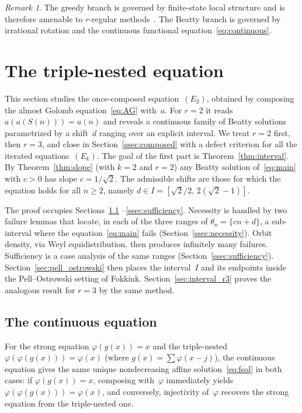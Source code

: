 \documentclass{birkjour}
\theoremstyle{definition}
\theoremstyle{remark}
\newtheorem{remark}[theorem]{Remark}
\newcommand{\frc}[1]{\{ #1 \}}
\begin{document}
\begin{remark}
The greedy branch is governed by finite-state
local structure and is therefore amenable to
$r$-regular methods~\cite{Cloitre_AG,AS}.
The Beatty branch is governed by irrational rotation
and the continuous functional
equation~\eqref{eq:continuous}.
\end{remark}

\section{The triple-nested equation}\label{sec:interval}

This section studies the once-composed equation~$(E_{2})$,
obtained by composing the almost Golomb
equation~\eqref{eq:AG} with~$a$. For $r=2$ it reads
$a(a(S(n)))=a(n)$ and reveals a continuous family of Beatty
solutions parametrized by a shift~$d$ ranging over an explicit
interval. We treat $r=2$ first, then $r=3$, and close in
Section~\ref{ssec:composed} with a defect criterion for all
the iterated equations~$(E_{k})$. The goal of the first part
is Theorem~\ref{thm:interval}. By Theorem~\ref{thm:slope} (with
$k=2$ and $r=2$) any Beatty solution of~\eqref{eq:main} with
$c>0$ has slope $c=1/\!\sqrt{2}$. The admissible shifts are
those for which the equation holds for all $n\ge 2$, namely
$d\in I=[\sqrt{2}/2,\,2(\sqrt{2}-1)]$.

The proof occupies Sections~\ref{ssec:continuous}%
--\ref{ssec:sufficiency}. Necessity is handled by
two failure lemmas that locate, in each of the three
ranges of $\theta_{n}=\frc{cn+d}$, a
sub-interval where the equation~\eqref{eq:main} fails
(Section~\ref{ssec:necessity}). Orbit density, via
Weyl equidistribution, then produces infinitely many
failures. Sufficiency is a case analysis of the same
ranges (Section~\ref{ssec:sufficiency}).
Section~\ref{sec:pell_ostrowski} then places the
interval~$I$ and its endpoints inside the
Pell--Ostrowski setting of Fokkink.
Section~\ref{sec:interval_r3} proves the
analogous result for $r=3$ by the same method.

\subsection{The continuous equation}
\label{ssec:continuous}

For the strong equation $\varphi(g(x))=x$
and the triple-nested $\varphi(\varphi(g(x)))=\varphi(x)$
(where $g(x)=\sum\varphi(x{-}j)$),
the continuous equation gives the same unique nondecreasing affine
solution~\eqref{eq:fsol} in both cases:
if $\varphi(g(x))=x$, composing with~$\varphi$
immediately yields $\varphi(\varphi(g(x)))=\varphi(x)$,
and conversely, injectivity of~$\varphi$ recovers
the strong equation from the triple-nested one.
\end{document}
